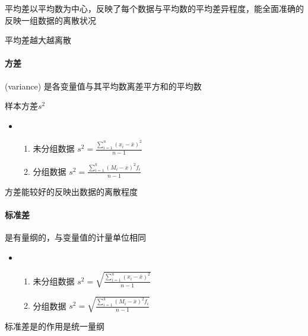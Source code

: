 \documentclass[UTF8,10pt]{book}
\begin{document}
                {\kaishu 平均差以平均数为中心，反映了每个数据与平均数的平均差异程度，能全面准确的反映一组数据的离散状况}

                {\kaishu 平均差越大越离散}

                \paragraph{方差} (variance) 是各变量值与其平均数离差平方和的平均数

                样本方差$s^2$
                    \begin{itemize}
                        \item [] {
                            \begin{enumerate}
                                \item 未分组数据 $ s^2 = \frac{\sum_{i=1}^n (x_i-\overline{x})^2}{n-1} $
                                \item 分组数据  $ s^2 = \frac{\sum_{i=1}^k (M_i-\overline{x})^2 f_i}{n-1} $
                            
                            \end{enumerate}
                        }
                    \end{itemize}

                    {\kaishu 方差能较好的反映出数据的离散程度}

                \paragraph{标准差} 是有量纲的，与变量值的计量单位相同
                    \begin{itemize}
                        \item [] {
                            \begin{enumerate}
                                \item 未分组数据 $ s^2 = \sqrt{\frac{\sum_{i=1}^n (x_i-\overline{x})^2}{n-1}} $
                                \item 分组数据  $ s^2 = \sqrt{\frac{\sum_{i=1}^k (M_i-\overline{x})^2 f_i}{n-1} }$
                            
                            \end{enumerate}
                        }
                    \end{itemize}

                {\kaishu 标准差是的作用是统一量纲}
\end{document}
